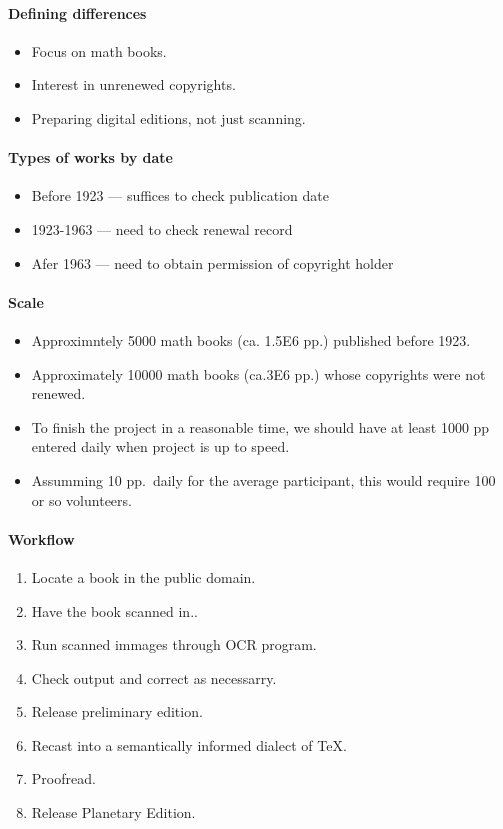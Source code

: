 \begin{itemize}
\begin{itemize}
\paragraph{Defining differences}

\begin{itemize}
\item
  Focus on math books.
\item
  Interest in unrenewed copyrights.
\item
  Preparing digital editions, not just scanning.
\end{itemize}

\paragraph{Types of works by date}

\begin{itemize}
\item
  Before 1923 --- suffices to check publication date
\item
  1923-1963 --- need to check renewal record
\item
  Afer 1963 --- need to obtain permission of copyright holder
\end{itemize}

\paragraph{Scale}

\begin{itemize}
\item
  Approximntely 5000 math books (ca. 1.5E6 pp.) published before 1923.
\item
  Approximately 10000 math books (ca.3E6 pp.) whose copyrights were not
  renewed.
\item
  To finish the project in a reasonable time, we should have at least
  1000 pp entered daily when project is up to speed.
\item
  Assumming 10 pp.~daily for the average participant, this would require
  100 or so volunteers.
\end{itemize}

\paragraph{Workflow}

\begin{enumerate}
\item Locate a book in the public domain. 
\item Have the book scanned in.. 
\item Run scanned immages through OCR program. 
\item Check output and correct as necessarry. 
\item Release preliminary edition. 
\item Recast into a semantically informed dialect of TeX. 
\item Proofread. 
\item Release Planetary Edition.
\end{enumerate}


\end{itemize}
\end{itemize}
